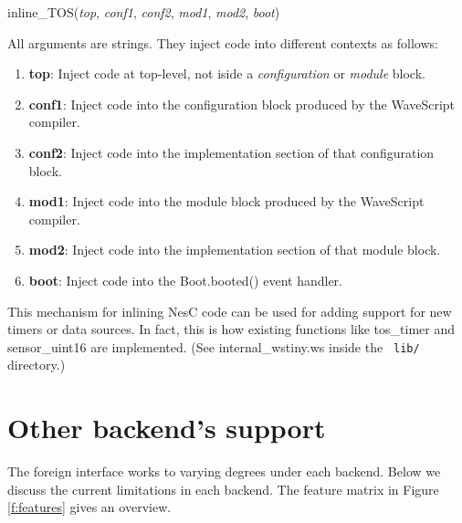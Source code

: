 \begin{wscode}
inline\_TOS({\em top}, {\em conf1}, {\em conf2}, {\em mod1}, {\em mod2}, {\em boot})
\end{wscode}

All arguments are strings.  They inject code into different contexts
as follows:
\begin{enumerate}
\item {\bf top}: Inject code at top-level, not iside a {\em configuration}
  or {\em module} block.
\item {\bf conf1}: Inject code into the {\cde configuration} block produced
  by the WaveScript compiler.
\item {\bf conf2}: Inject code into the {\cde implementation} section of
  that {\cde configuration} block.
\item {\bf mod1}: Inject code into the {\cde module} block produced
  by the WaveScript compiler.
\item {\bf mod2}: Inject code into the {\cde implementation} section of
  that {\cde module} block.
\item {\bf boot}: Inject code into the {\cde Boot.booted()} event handler.
\end{enumerate}

This mechanism for inlining NesC code can be used for adding support
for new timers or data sources.  In fact, this is how existing
 functions like {\cde tos\_timer} and {\cde sensor\_uint16}
are implemented.  (See {\cde internal\_wstiny.ws} inside the {\tt
  lib/} directory.)

\section{Other backend's support}

The foreign interface works to varying degrees under each backend.
Below we discuss the current  limitations in each
 backend.  The feature matrix in Figure \ref{f:features} gives an
 overview.


